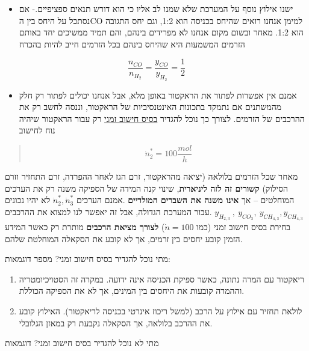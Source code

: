 \documentclass[
  hebrew,
  letterpaper,
  DIV=11,
  numbers=noendperiod]{scrreprt}
\providecommand{\tightlist}{%
  \setlength{\itemsep}{0pt}\setlength{\parskip}{0pt}}
\begin{document}
\begin{itemize}
\tightlist
\item
  ישנו אילוץ נוסף על המערכת שלא שמנו לב אליו כי הוא דורש תנאים
  ספציפיים.- אם נסתכל על היחס בין הCO למימן אנחנו רואים שהיחס בכניסה הוא
  1:2, וגם יחס התגובה הוא 1:2. מאחר ובשום מקום אנחנו לא מפרידים בינהם,
  והם תמיד ממשיכים יחד באותם הזרמים המשמעות היא שהיחס בינהם בכל הזרמים
  חייב להיות בהכרח
\end{itemize}

\[\frac{n_{CO}}{n_{H_{2}}} = \frac{y_{CO}}{y_{H_{2}}} = \frac{1}{2}\]

\begin{itemize}
\tightlist
\item
  אמנם אין אפשרות לפתור את הראקטור באופן מלא, אבל אנחנו יכולים לפתור רק
  חלק מהמשתנים אם נתמקד בתכונות האינטנסיביות של הראקטור, וננסה לחשב רק
  את ההרכבים של הזרמים. לצורך כך נוכל להגדיר \ul{בסיס חישוב זמני} רק
  עבור הראקטור שיהיה נוח לחישוב
\end{itemize}

\begin{quote}
\[{\dot{n}}_{2}^{*} = 100\frac{mol}{h}\]
\end{quote}

מאחר שכל הזרמים בלולאה (יציאה מהראקטור, זרם הגז לאחר ההפרדה, זרם התחזיר
וזרם הסילוק) \textbf{קשורים זה לזה ליניארית}, שינוי קנה המידה של הספיקה
משנה רק את הערכים המוחלטים -- אך \textbf{אינו משנה את השברים המולריים}
.אמנם הערכים \({\dot{n}}_{2}^{*},{\dot{n}}_{3}^{*}\) לא יהיו נכונים עבור
המערכת הגדולה, אבל זה יאפשר לנו למצוא את ההרכבים.
\(y_{H_{2,3}}\ ,\ y_{CO_{3}},\ y_{{CH}_{4,3}},y_{{CH}_{4,3}}\)\\

בחירת בסיס חישוב זמני (כמו \(\dot{n} = 100\)) \textbf{לצורך מציאת
הרכבים} מותרת רק כאשר המידע הזמין קובע יחסים בין זרמים, אך לא קובע את
הסקאלה המוחלטת שלהם.

מתי נוכל להגדיר בסיס חישוב זמני? מספר דוגמאות:

\begin{enumerate}
\def\labelenumi{\arabic{enumi}.}
\item
  ריאקטור עם המרה נתונה, כאשר ספיקת הכניסה אינה ידועה. במקרה זה
  הסטויכיומטריה וההמרה קובעות את היחסים בין המינים, אך לא את הספיקה
  הכוללת.
\item
  לולאת תחזיר עם אילוץ על הרכב (למשל ריכוז אינרטי בכניסה לריאקטור).
  האילוץ קובע את ההרכב בלולאה, אך הסקאלה נקבעת רק במאזן הגלובלי.
\end{enumerate}

מתי לא נוכל להגדיר בסיס חישוב זמני? דוגמאות
\end{document}
